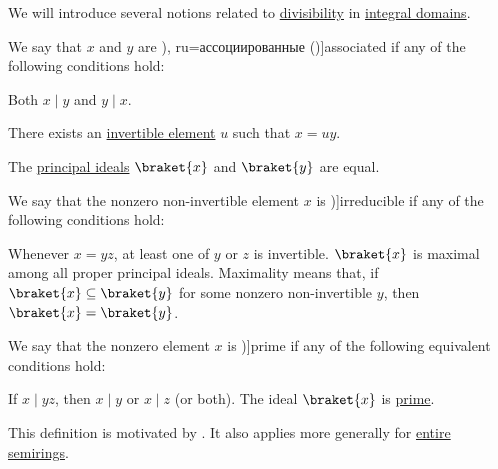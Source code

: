 \begin{definition}\label{def:domain_divisibility}
  We will introduce several notions related to \hyperref[def:divisibility]{divisibility} in \hyperref[def:integral_domain]{integral domains}.

  \begin{thmenum}
     We say that \( x \) and \( y \) are \term[bg=асоциирани (\cite[142]{ГеновМиховскиМоллов1991Алгебра}), ru=ассоциированные (\cite[118]{Винберг2014КурсАлгебры})]{associated} if any of the following conditions hold:
    \begin{thmenum}
       Both \( x \mid y \) and \( y \mid x \).

       There exists an \hyperref[def:divisibility/invertible]{invertible element} \( u \) such that \( x = uy \).

       The \hyperref[def:semiring_ideal/principal]{principal ideals} \( \braket{ x } \) and \( \braket{ y } \) are equal.
    \end{thmenum}

     We say that the nonzero non-invertible element \( x \) is \term[ru=неприводимый (\cite[125]{Тыртышников2017ОсновыАлгебры})]{irreducible} if any of the following conditions hold:
    \begin{thmenum}
       Whenever \( x = yz \), at least one of \( y \) or \( z \) is invertible.
       \( \braket{ x } \) is maximal among all proper principal ideals. Maximality means that, if \( \braket{ x } \subseteq \braket{ y } \) for some nonzero non-invertible \( y \), then \( \braket{ x } = \braket{ y } \).
    \end{thmenum}

     We say that the nonzero element \( x \) is \term[ru=неприводимый (\cite[125]{Тыртышников2017ОсновыАлгебры})]{prime} if any of the following equivalent conditions hold:
    \begin{thmenum}
       If \( x \mid yz \), then \( x \mid y \) or \( x \mid z \) (or both).
       The ideal \( \braket{ x } \) is \hyperref[def:semiring_ideal/prime]{prime}.
    \end{thmenum}

    This definition is motivated by . It also applies more generally for \hyperref[def:entire_semiring]{entire semirings}.
  \end{thmenum}
\end{definition}
